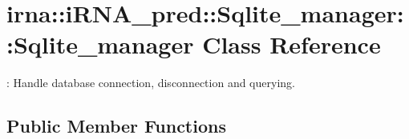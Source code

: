 \hypertarget{classirna_1_1iRNA__pred_1_1Sqlite__manager_1_1Sqlite__manager}{
\section{irna\-:\-:i\-R\-N\-A\-\_\-pred\-:\-:\-Sqlite\-\_\-manager\-:\-:\-Sqlite\-\_\-manager \-Class \-Reference}
\label{classirna_1_1iRNA__pred_1_1Sqlite__manager_1_1Sqlite__manager}
}


\-: \-Handle database connection, disconnection and querying.  


\subsection*{\-Public \-Member \-Functions}
